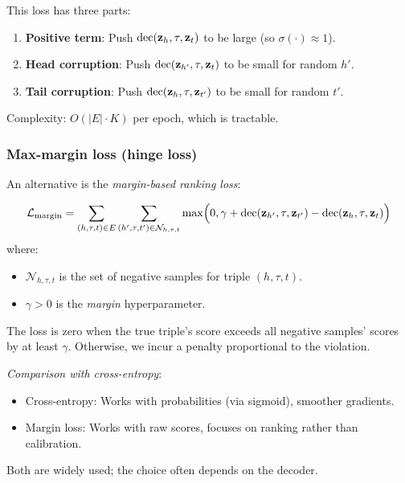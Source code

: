 \begin{notechapter}
\begin{intuition}
This loss has three parts:
\begin{enumerate}
    \item \textbf{Positive term}: Push $\text{dec}(\mathbf{z}_h, \tau, \mathbf{z}_t)$ to be large (so $\sigma(\cdot) \approx 1$).
    \item \textbf{Head corruption}: Push $\text{dec}(\mathbf{z}_{h'}, \tau, \mathbf{z}_t)$ to be small for random $h'$.
    \item \textbf{Tail corruption}: Push $\text{dec}(\mathbf{z}_h, \tau, \mathbf{z}_{t'})$ to be small for random $t'$.
\end{enumerate}
Complexity: $O(|E| \cdot K)$ per epoch, which is tractable.
\end{intuition}

\subsubsection*{Max-margin loss (hinge loss)}

An alternative is the \emph{margin-based ranking loss}:

\begin{definition}
\begin{equation}
\mathcal{L}_{\text{margin}} = \sum_{(h,\tau,t) \in E} \sum_{(h',\tau,t') \in \mathcal{N}_{h,\tau,t}} \max\Bigl(0, \gamma + \text{dec}(\mathbf{z}_{h'}, \tau, \mathbf{z}_{t'}) - \text{dec}(\mathbf{z}_h, \tau, \mathbf{z}_t)\Bigr)
\end{equation}
where:
\begin{itemize}
    \item $\mathcal{N}_{h,\tau,t}$ is the set of negative samples for triple $(h, \tau, t)$.
    \item $\gamma > 0$ is the \emph{margin} hyperparameter.
\end{itemize}
\end{definition}

\begin{intuition}
The loss is zero when the true triple's score exceeds all negative samples' scores by at least $\gamma$. Otherwise, we incur a penalty proportional to the violation.

\emph{Comparison with cross-entropy}:
\begin{itemize}
    \item Cross-entropy: Works with probabilities (via sigmoid), smoother gradients.
    \item Margin loss: Works with raw scores, focuses on ranking rather than calibration.
\end{itemize}
Both are widely used; the choice often depends on the decoder.
\end{intuition}


\end{notechapter}
